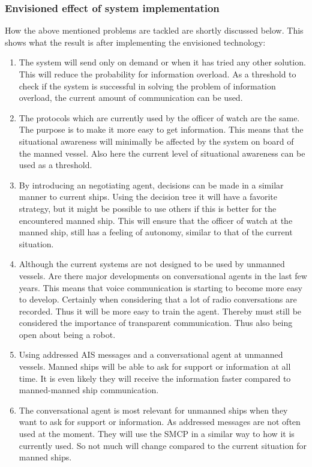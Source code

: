 \subsubsection{Envisioned effect of system implementation}
How the above mentioned problems are tackled are shortly discussed below. This shows what the result is after implementing the envisioned technology:
\begin{enumerate}
	\item The system will send only on demand or when it has tried any other solution. This will reduce the probability for information overload. As a threshold to check if the system is successful in solving the problem of information overload, the current amount of communication can be used.
	\item The protocols which are currently used by the officer of watch are the same. The purpose is to make it more easy to get information. This means that the situational awareness will minimally be affected by the system on board of the manned vessel. Also here the current level of situational awareness can be used as a threshold.
	\item By introducing an negotiating agent, decisions can be made in a similar manner to current ships. Using the decision tree it will have a favorite strategy, but it might be possible to use others if this is better for the encountered manned ship. This will ensure that the officer of watch at the manned ship, still has a feeling of autonomy, similar to that of the current situation. 
	\item Although the current systems are not designed to be used by unmanned vessels. Are there major developments on conversational agents in the last few years. This means that voice communication is starting to become more easy to develop. Certainly when considering that a lot of radio conversations are recorded. Thus it will be more easy to train the agent. Thereby must still be considered the importance of transparent communication. Thus also being open about being a robot. 

	\item Using addressed \ac{AIS} messages and a conversational agent at unmanned vessels. Manned ships will be able to ask for support or information at all time. It is even likely they will receive the information faster compared to manned-manned ship communication.
	\item The conversational agent is most relevant for unmanned ships when they want to ask for support or information. As addressed messages are not often used at the moment. They will use the \ac{SMCP} in a similar way to how it is currently used. So not much will change compared to the current situation for manned ships.
\end{enumerate}

